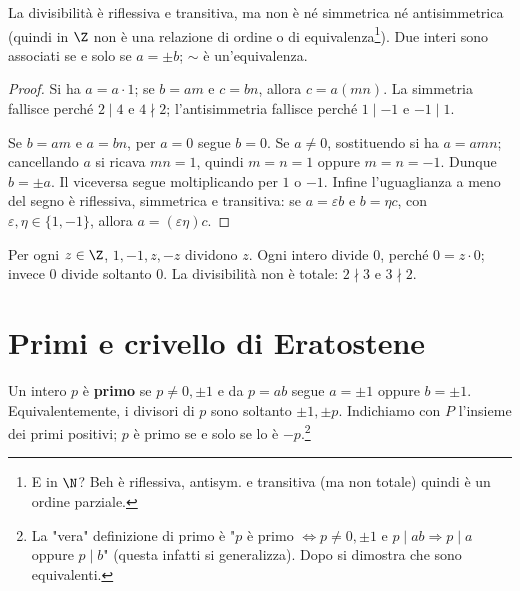\begin{proposizione}
La divisibilità è riflessiva e transitiva, ma non è né simmetrica né antisimmetrica (quindi in $\Z$ non è una relazione di ordine o di equivalenza\footnote{E in $\N$? Beh è riflessiva, antisym. e transitiva (ma non totale) quindi è un ordine parziale.}). Due interi sono associati se e solo se $a=\pm b$; $\sim$ è un'equivalenza.
\end{proposizione}
\begin{proof}
Si ha $a=a\cdot1$; se $b=am$ e $c=bn$, allora $c=a(mn)$. La simmetria fallisce perché $2\mid4$ e $4\nmid2$; l'antisimmetria fallisce perché $1\mid-1$ e $-1\mid1$.

Se $b=am$ e $a=bn$, per $a=0$ segue $b=0$. Se $a\ne0$, sostituendo si ha $a=amn$; cancellando $a$ si ricava $mn=1$, quindi $m=n=1$ oppure $m=n=-1$. Dunque $b=\pm a$. Il viceversa segue moltiplicando per $1$ o $-1$. Infine l'uguaglianza a meno del segno è riflessiva, simmetrica e transitiva: se $a=\varepsilon b$ e $b=\eta c$, con $\varepsilon,\eta\in\{1,-1\}$, allora $a=(\varepsilon\eta)c$.
\end{proof}

\begin{osservazione}
Per ogni $z\in\Z$, $1,-1,z,-z$ dividono $z$. Ogni intero divide $0$, perché $0=z\cdot0$; invece $0$ divide soltanto $0$. La divisibilità non è totale: $2\nmid3$ e $3\nmid2$.
\end{osservazione}

\section{Primi e crivello di Eratostene}
\begin{definizione}
Un intero $p$ è \textbf{primo} se $p\ne0,\pm1$ e da $p=ab$ segue $a=\pm1$ oppure $b=\pm1$. Equivalentemente, i divisori di $p$ sono soltanto $\pm1,\pm p$. Indichiamo con $P$ l'insieme dei primi positivi; $p$ è primo se e solo se lo è $-p$.\footnote{La "vera" definizione di primo è "$p$ è primo $\iff p\ne0,\pm1$ e $p\mid ab\Rightarrow p\mid a$ oppure $p\mid b$" (questa infatti si generalizza). Dopo si dimostra che sono equivalenti.}
\end{definizione}

